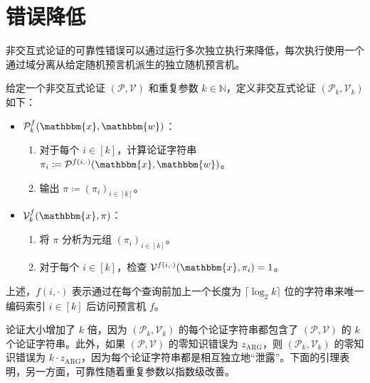 \documentclass[american,singlepageview]{snargs-book-zh}
\newcommand{\DefineEqual}{\coloneqq}
\newcommand{\ceil}[1]{\lceil{#1}\rceil}
\newcommand{\Naturals}{\mathbb{N}}
\newcommand{\Instance}{\mathbbm{x}}
\newcommand{\Witness}{\mathbbm{w}}
\newcommand{\ProtoProver}{P}
\newcommand{\ProtoVerifier}{V}
\newcommand{\ProtoZKError}{z}
\newcommand{\ARGSubscript}{\scriptscriptstyle\mathrm{ARG}}
\newcommand{\ARGFormat}[1]{\mathcal{#1}}
\newcommand{\ARGProver}{\ARGFormat{\ProtoProver}}
\newcommand{\ARGVerifier}{\ARGFormat{\ProtoVerifier}}
\newcommand{\ARGString}{\pi}
\newcommand{\ARGZKError}{\ProtoZKError_{\ARGSubscript}}
\newcommand{\ARGRepetitionParameter}{k}
\newcommand{\ROFunction}{f}
\begin{document}
\section{错误降低}
\label{section:soundness-error-reduction}

非交互式论证的可靠性错误可以通过运行多次独立执行来降低，每次执行使用一个通过域分离从给定随机预言机派生的独立随机预言机。

\begin{construction}
\label{construction:narg-error-reduction}
给定一个非交互式论证 $(\ARGProver,\ARGVerifier)$ 和重复参数 $\ARGRepetitionParameter \in \Naturals$，定义非交互式论证 $(\ARGProver_{\ARGRepetitionParameter},\ARGVerifier_{\ARGRepetitionParameter})$ 如下：
\begin{itemize}
  \item $\ARGProver_{\ARGRepetitionParameter}^{\ROFunction}(\Instance,\Witness)$：
    \begin{enumerate}[nolistsep]
      \item 对于每个 $i \in [\ARGRepetitionParameter]$，计算论证字符串 $\ARGString_{i} \DefineEqual \ARGProver^{\ROFunction(i,\cdot)}(\Instance,\Witness)$。
      \item 输出 $\ARGString \DefineEqual (\ARGString_{i})_{i \in [\ARGRepetitionParameter]}$。
    \end{enumerate}
  \item $\ARGVerifier_{\ARGRepetitionParameter}^{\ROFunction}(\Instance,\ARGString)$：
    \begin{enumerate}[nolistsep]
      \item 将 $\ARGString$ 分析为元组 $(\ARGString_{i})_{i \in [\ARGRepetitionParameter]}$。
      \item 对于每个 $i \in [\ARGRepetitionParameter]$，检查 $\ARGVerifier^{\ROFunction(i,\cdot)}(\Instance,\ARGString_{i})=1$。
    \end{enumerate}
\end{itemize}
上述，$\ROFunction(i,\cdot)$ 表示通过在每个查询前加上一个长度为 $\ceil{\log_{2} \ARGRepetitionParameter}$ 位的字符串来唯一编码索引 $i \in [\ARGRepetitionParameter]$ 后访问预言机 $\ROFunction$。
\end{construction}

论证大小增加了 $\ARGRepetitionParameter$ 倍，因为 $(\ARGProver_{\ARGRepetitionParameter},\ARGVerifier_{\ARGRepetitionParameter})$ 的每个论证字符串都包含了 $(\ARGProver,\ARGVerifier)$ 的 $\ARGRepetitionParameter$ 个论证字符串。此外，如果 $(\ARGProver,\ARGVerifier)$ 的零知识错误为 $\ARGZKError$，则 $(\ARGProver_{\ARGRepetitionParameter},\ARGVerifier_{\ARGRepetitionParameter})$ 的零知识错误为 $\ARGRepetitionParameter \cdot \ARGZKError$，因为每个论证字符串都是相互独立地“泄露”。下面的引理表明，另一方面，可靠性随着重复参数以指数级改善。
\end{document}
